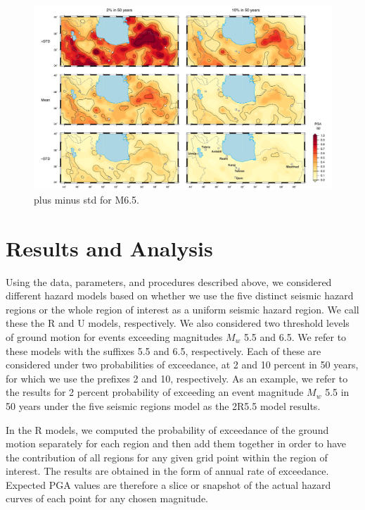 \begin{figure}[t]
    \centering
    \includegraphics[width=\textwidth]{figures/pdf/figure-10.pdf} 
    \caption{plus minus std for M6.5.}
    \label{fig:pgastd}
\end{figure}

\section{Results and Analysis}

Using the data, parameters, and procedures described above, we considered different hazard models based on whether we use the five distinct seismic hazard regions or the whole region of interest as a uniform seismic hazard region. We call these the R and U models, respectively. We also considered two threshold levels of ground motion for events exceeding magnitudes $M_w$ 5.5 and 6.5. We refer to these models with the suffixes 5.5 and 6.5, respectively. Each of these are considered under two probabilities of exceedance, at 2 and 10 percent in 50 years, for which we use the prefixes 2 and 10, respectively. As an example, we refer to the results for 2 percent probability of exceeding an event magnitude $M_w$ 5.5 in 50 years under the five seismic regions model as the 2R5.5 model results.

In the R models, we computed the probability of exceedance of the ground motion separately for each region and then add them together in order to have the contribution of all regions for any given grid point within the region of interest. The results are obtained in the form of annual rate of exceedance. Expected PGA values are therefore a slice or snapshot of the actual hazard curves of each point for any chosen magnitude. 

